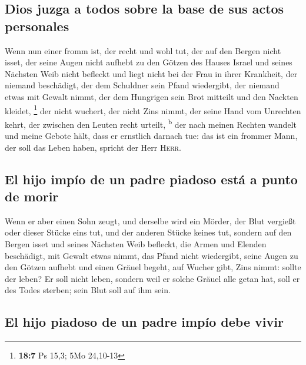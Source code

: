 \hypertarget{dios-juzga-a-todos-sobre-la-base-de-sus-actos-personales}{%
\subsection{Dios juzga a todos sobre la base de sus actos
personales}\label{dios-juzga-a-todos-sobre-la-base-de-sus-actos-personales}}

 Wenn nun einer fromm ist, der recht und wohl tut,
 der auf den Bergen nicht isset, der seine Augen nicht
aufhebt zu den Götzen des Hauses Israel und seines Nächsten Weib nicht
befleckt und liegt nicht bei der Frau in ihrer Krankheit, 
der niemand beschädigt, der dem Schuldner sein Pfand wiedergibt, der
niemand etwas mit Gewalt nimmt, der dem Hungrigen sein Brot mitteilt und
den Nackten kleidet, \footnote{\textbf{18:7} Ps 15,3; 5Mo 24,10-13}
 der nicht wuchert, der nicht Zins nimmt, der seine Hand
vom Unrechten kehrt, der zwischen den Leuten recht urteilt,
\textsuperscript{b}  der nach meinen Rechten wandelt und
meine Gebote hält, dass er ernstlich darnach tue: das ist ein frommer
Mann, der soll das Leben haben, spricht der Herr \textsc{Herr}.

\hypertarget{el-hijo-impuxedo-de-un-padre-piadoso-estuxe1-a-punto-de-morir}{%
\subsection{El hijo impío de un padre piadoso está a punto de
morir}\label{el-hijo-impuxedo-de-un-padre-piadoso-estuxe1-a-punto-de-morir}}

 Wenn er aber einen Sohn zeugt, und derselbe wird ein
Mörder, der Blut vergießt oder dieser Stücke eins tut, 
und der anderen Stücke keines tut, sondern auf den Bergen isset und
seines Nächsten Weib befleckt,  die Armen und Elenden
beschädigt, mit Gewalt etwas nimmt, das Pfand nicht wiedergibt, seine
Augen zu den Götzen aufhebt und einen Gräuel begeht,  auf
Wucher gibt, Zins nimmt: sollte der leben? Er soll nicht leben, sondern
weil er solche Gräuel alle getan hat, soll er des Todes sterben; sein
Blut soll auf ihm sein.

\hypertarget{el-hijo-piadoso-de-un-padre-impuxedo-debe-vivir}{%
\subsection{El hijo piadoso de un padre impío debe
vivir}\label{el-hijo-piadoso-de-un-padre-impuxedo-debe-vivir}}

